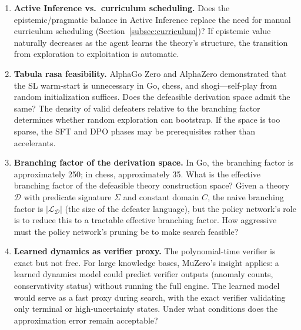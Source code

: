 \documentclass{article}
\theoremstyle{definition}
\newcommand{\D}{\mathcal{D}}
\begin{document}
\begin{enumerate}[nosep]
    \item \textbf{Active Inference vs.\ curriculum scheduling.} Does the epistemic/pragmatic balance in Active Inference replace the need for manual curriculum scheduling (Section~\ref{subsec:curriculum})? If epistemic value naturally decreases as the agent learns the theory's structure, the transition from exploration to exploitation is automatic.
    \item \textbf{Tabula rasa feasibility.} AlphaGo Zero and AlphaZero demonstrated that the SL warm-start is unnecessary in Go, chess, and shogi---self-play from random initialization suffices. Does the defeasible derivation space admit the same? The density of valid defeaters relative to the branching factor determines whether random exploration can bootstrap. If the space is too sparse, the SFT and DPO phases may be prerequisites rather than accelerants.
    \item \textbf{Branching factor of the derivation space.} In Go, the branching factor is approximately 250; in chess, approximately 35. What is the effective branching factor of the defeasible theory construction space? Given a theory $\D$ with predicate signature $\Sigma$ and constant domain $C$, the naive branching factor is $|\mathcal{L}_\D|$ (the size of the defeater language), but the policy network's role is to reduce this to a tractable effective branching factor. How aggressive must the policy network's pruning be to make search feasible?
    \item \textbf{Learned dynamics as verifier proxy.} The polynomial-time verifier is exact but not free. For large knowledge bases, MuZero's insight applies: a learned dynamics model could predict verifier outputs (anomaly counts, conservativity status) without running the full engine. The learned model would serve as a fast proxy during search, with the exact verifier validating only terminal or high-uncertainty states. Under what conditions does the approximation error remain acceptable?
\end{enumerate}
\end{document}
